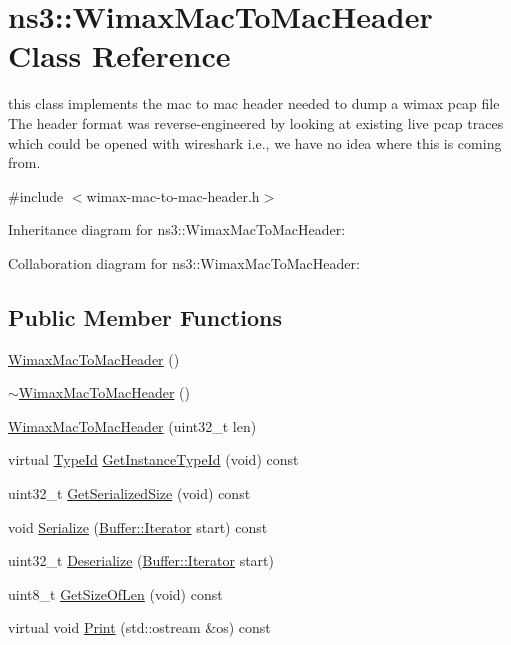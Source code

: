 \hypertarget{classns3_1_1WimaxMacToMacHeader}{}\section{ns3\+:\+:Wimax\+Mac\+To\+Mac\+Header Class Reference}
\label{classns3_1_1WimaxMacToMacHeader}


this class implements the mac to mac header needed to dump a wimax pcap file The header format was reverse-\/engineered by looking at existing live pcap traces which could be opened with wireshark i.\+e., we have no idea where this is coming from.  




{\ttfamily \#include $<$wimax-\/mac-\/to-\/mac-\/header.\+h$>$}



Inheritance diagram for ns3\+:\+:Wimax\+Mac\+To\+Mac\+Header\+:


Collaboration diagram for ns3\+:\+:Wimax\+Mac\+To\+Mac\+Header\+:
\subsection*{Public Member Functions}
\begin{DoxyCompactItemize}
\item 
\hyperlink{classns3_1_1WimaxMacToMacHeader_aad8f5f52f80eb3f656a171a0b92b4f94}{Wimax\+Mac\+To\+Mac\+Header} ()
\item 
\hyperlink{classns3_1_1WimaxMacToMacHeader_a5adf9a24a13e6c00af927c055c8c74e5}{$\sim$\+Wimax\+Mac\+To\+Mac\+Header} ()
\item 
\hyperlink{classns3_1_1WimaxMacToMacHeader_ac0add4d394a28e8558b59733df50b982}{Wimax\+Mac\+To\+Mac\+Header} (uint32\+\_\+t len)
\item 
virtual \hyperlink{classns3_1_1TypeId}{Type\+Id} \hyperlink{classns3_1_1WimaxMacToMacHeader_aa694f523db793ddf8ade34e3a3cdfdfb}{Get\+Instance\+Type\+Id} (void) const 
\item 
uint32\+\_\+t \hyperlink{classns3_1_1WimaxMacToMacHeader_a7a435e2e886d5d6fe2f4efebdf6c3ce8}{Get\+Serialized\+Size} (void) const 
\item 
void \hyperlink{classns3_1_1WimaxMacToMacHeader_a39eb561e07f3f3e1596bf7a985c16332}{Serialize} (\hyperlink{classns3_1_1Buffer_1_1Iterator}{Buffer\+::\+Iterator} start) const 
\item 
uint32\+\_\+t \hyperlink{classns3_1_1WimaxMacToMacHeader_a002bae0fe12f8363d3d06e286e802913}{Deserialize} (\hyperlink{classns3_1_1Buffer_1_1Iterator}{Buffer\+::\+Iterator} start)
\item 
uint8\+\_\+t \hyperlink{classns3_1_1WimaxMacToMacHeader_a1f3d74adc741d8e938b7c4a51ea3eb2b}{Get\+Size\+Of\+Len} (void) const 
\item 
virtual void \hyperlink{classns3_1_1WimaxMacToMacHeader_aa9e76b23c93710be1cba9f5a4777894a}{Print} (std\+::ostream \&os) const 
\end{DoxyCompactItemize}
